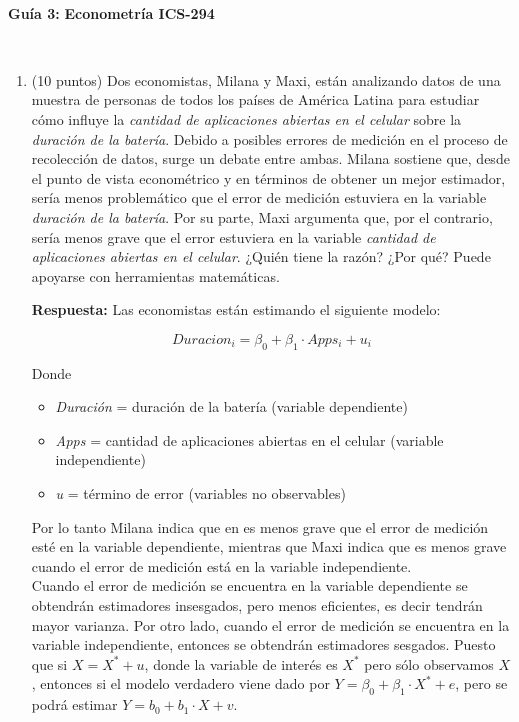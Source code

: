 \documentclass[10pt,a4paper]{article}
\begin{document}
\vspace{5cm}



\begin{center}
\begin{Large}
\textbf{\\Guía 3:}
\textbf{Econometría ICS-294}
\end{Large}\\

\end{center}


\begin{enumerate}
    \item (10 puntos) Dos economistas, Milana y Maxi, están analizando datos de una muestra de personas de todos los países de América Latina para estudiar cómo influye la \textit{cantidad de aplicaciones abiertas en el celular} sobre la \textit{duración de la batería}. 
    Debido a posibles errores de medición en el proceso de recolección de datos, surge un debate entre ambas. Milana sostiene que, desde el punto de vista econométrico y en términos de obtener un mejor estimador, sería menos problemático que el error de medición estuviera en la variable \textit{duración de la batería}. Por su parte, Maxi argumenta que, por el contrario, sería menos grave que el error estuviera en la variable \textit{cantidad de aplicaciones abiertas en el celular}. ¿Quién tiene la razón? ¿Por qué? Puede apoyarse con herramientas matemáticas.

   
  {\color{red}  \textbf{Respuesta:} Las economistas están estimando el siguiente modelo:

    $$Duracion_i = \beta_0 + \beta_1 \cdot Apps_i + u_i$$

    Donde
    \begin{itemize}
        \item \textit{Duración} = duración de la batería (variable dependiente)
        \item \textit{Apps} = cantidad de aplicaciones abiertas en el celular (variable independiente)
        \item \textit{u} = término de error (variables no observables)
    \end{itemize}

    Por lo tanto Milana indica que en es menos grave que el error de medición esté en la variable dependiente, mientras que Maxi indica que es menos grave cuando el error de medición está en la variable independiente. \\
    Cuando el error de medición se encuentra en la variable dependiente se obtendrán estimadores insesgados, pero menos eficientes, es decir tendrán mayor varianza. Por otro lado, cuando el error de medición se encuentra en la variable independiente, entonces se obtendrán estimadores sesgados. Puesto que si $X = X^* + u$, donde la variable de interés es $X^*$ pero sólo observamos $X$, entonces si el modelo verdadero viene dado por $Y = \beta_0 + \beta_1 \cdot X^* + e$, pero  se podrá estimar $Y = b_0 + b_1 \cdot X + v$.

}
\end{enumerate}
\end{document}
